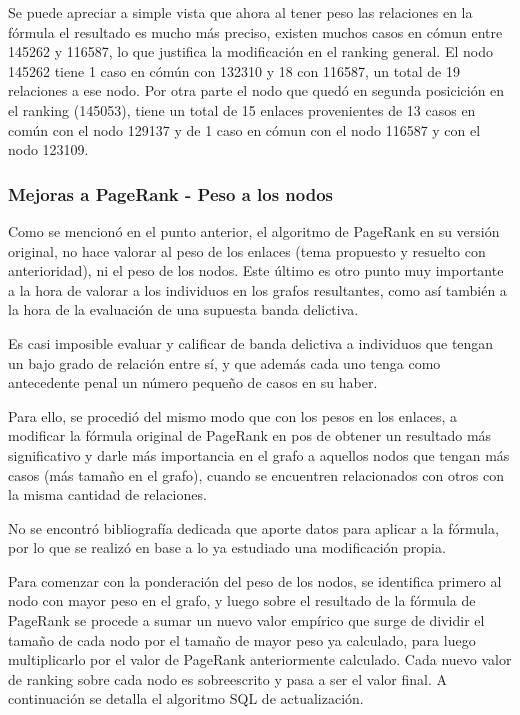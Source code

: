 Se puede apreciar a simple vista que ahora al tener peso las relaciones en la fórmula el resultado es mucho más preciso, existen muchos casos en cómun entre 145262 y 116587, lo que justifica la modificación en el ranking general. El nodo 
145262 tiene 1 caso en cómún con 132310 y 18 con 116587, un total de 19 relaciones a ese nodo. Por otra parte el nodo que quedó en segunda posicición en el ranking (145053), tiene un total de 15 enlaces provenientes de 13 casos en común con el nodo 129137 y de 1 caso en cómun con el nodo 116587 y con el nodo 123109.

\subsubsection{Mejoras a PageRank - Peso a los nodos}

Como se mencionó en el punto anterior, el algoritmo de PageRank en su versión original, no hace valorar al peso de los enlaces (tema propuesto y resuelto con anterioridad), ni el peso de los nodos. Este último es otro punto muy importante a la hora de valorar a los individuos en los grafos resultantes, como así también a la hora de la evaluación de una supuesta banda delictiva.

Es casi imposible evaluar y calificar de banda delictiva a individuos que tengan un bajo grado de relación entre sí, y que además cada uno tenga como antecedente penal un número pequeño de casos en su haber.

Para ello, se procedió del mismo modo que con los pesos en los enlaces, a modificar la fórmula original de PageRank en pos de obtener un resultado más significativo y darle más importancia en el grafo a aquellos nodos que tengan más casos (más tamaño en el grafo), cuando se encuentren relacionados con otros con la misma cantidad de relaciones.

No se encontró bibliografía dedicada que aporte datos para aplicar a la fórmula, por lo que se realizó  en base a lo ya estudiado una modificación propia. 

Para comenzar con la ponderación del peso de los nodos, se identifica primero al nodo con mayor peso en el grafo, y luego sobre el resultado de la fórmula de PageRank se procede a sumar un nuevo valor empírico que surge de dividir el tamaño de cada nodo por el tamaño de mayor peso ya calculado, para luego multiplicarlo por el valor de PageRank anteriormente calculado. Cada nuevo valor de ranking sobre cada nodo es sobreescrito y pasa a ser el valor final. A continuación se detalla el algoritmo SQL de actualización.

